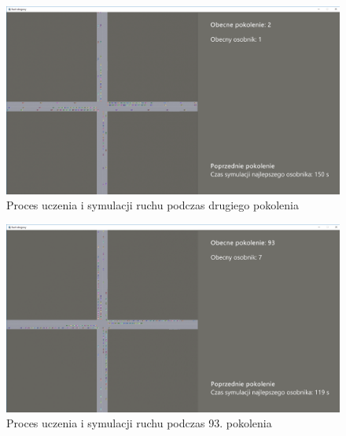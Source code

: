 \begin{figure}
	\centering
	\includegraphics[width=1\linewidth]{ap3}
	\caption[Proces uczenia i symulacji ruchu]{Proces uczenia i symulacji ruchu podczas drugiego pokolenia}
	\label{fig:ap3}
\end{figure}
\begin{figure}
	\centering
	\includegraphics[width=1\linewidth]{ap4}
	\caption[Proces uczenia i symulacji ruchu]{Proces uczenia i symulacji ruchu podczas 93. pokolenia}
	\label{fig:ap4}
\end{figure}
